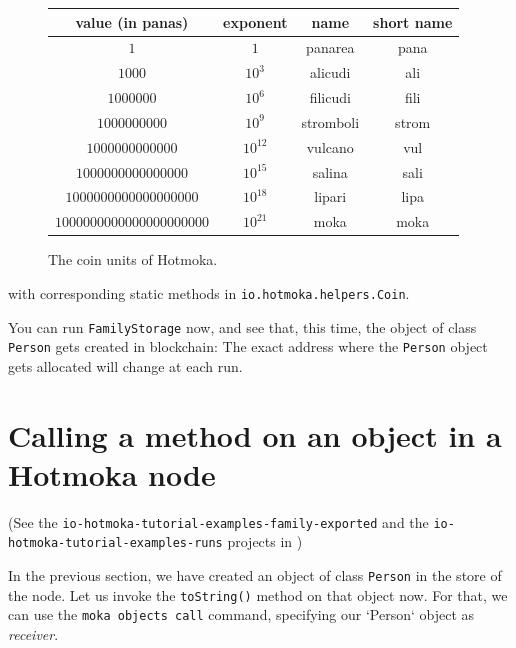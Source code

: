 \begin{figure}[t]
  \begin{center}
    \begin{tabular}{|c||c|c|c|}
      \hline
        value (in panas) & exponent & name & short name\\\hline\hline
        $1$ & $1$ & panarea & pana\\\hline
        $1000$ & $10^3$ & alicudi & ali\\\hline
        $1000000$ & $10^6$ & filicudi & fili\\\hline
        $1000000000$ & $10^9$ & stromboli & strom\\\hline
        $1000000000000$ & $10^{12}$ & vulcano & vul\\\hline
        $1000000000000000$ & $10^{15}$ & salina & sali\\\hline
        $1000000000000000000$ & $10^{18}$ & lipari & lipa\\\hline
        $1000000000000000000000$ & $10^{21}$ & moka & moka\\\hline
    \end{tabular}
  \end{center}
  \caption{The coin units of Hotmoka.}\label{fig:units}
\end{figure}
%
with corresponding static methods in \texttt{io.hotmoka.helpers.Coin}.

You can run \texttt{FamilyStorage} now, and see that, this time,
the object of class \texttt{Person} gets created in blockchain:
%
%
The exact address where the \texttt{Person} object gets allocated will change at each run.

\section{Calling a method on an object in a Hotmoka node}\label{sec:calling_method}

\begin{center}
  (See the \texttt{io-hotmoka-tutorial-examples-family-exported} and the
  \texttt{io-hotmoka-tutorial-examples-runs} projects in \texttt{\hotmokaRepo{}})
\end{center}

In the previous section, we have created an object of class \texttt{Person} in the store
of the node. Let us invoke the
\texttt{toString()} method on that object now. For that, we can use the
\texttt{moka objects call} command, specifying our `Person` object as \emph{receiver}.

